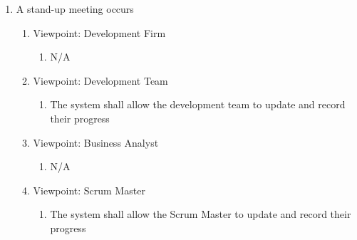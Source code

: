 \documentclass[12pt, titlepage]{article}
\begin{document}
\begin{enumerate}[{BE}1.]
    \item A stand-up meeting occurs %
    \begin{enumerate}[{VP}1.] 
        \item Viewpoint: Development Firm
            \begin{enumerate}
                \item[] N/A
            \end{enumerate}
        \item Viewpoint: Development Team
            \begin{enumerate}
                \item The system shall allow the development team to update and record their progress
            \end{enumerate}
        \item Viewpoint: Business Analyst
            \begin{enumerate}
                \item[] N/A
            \end{enumerate}
        \item Viewpoint: Scrum Master
            \begin{enumerate}
                \item The system shall allow the Scrum Master to update and record their progress
            \end{enumerate}
    \end{enumerate}


\end{enumerate}
\end{document}
